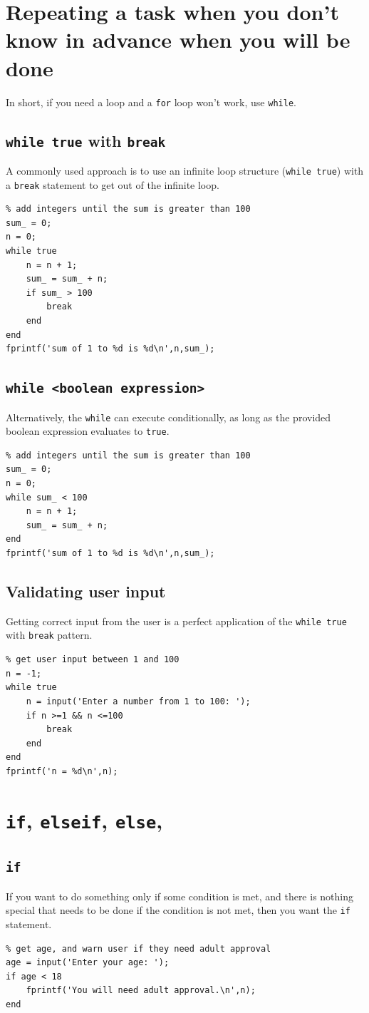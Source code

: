 \documentclass{report}[11pt]
\newcommand{\code}[1]{\texttt{#1}}
\begin{document}
\section{Repeating a task when you don't know in advance when you will be done}
In short, if you need a loop and a  \code{for} loop won't work, use \code{while}.
\subsection{\code{while true} with \code{break}}
A commonly used approach is to use an infinite loop structure (\code{while true}) with a \code{break} statement to get out of the infinite loop.
\begin{lstlisting}
% add integers until the sum is greater than 100
sum_ = 0;
n = 0;
while true
    n = n + 1;
    sum_ = sum_ + n;
    if sum_ > 100
        break
    end
end
fprintf('sum of 1 to %d is %d\n',n,sum_);
\end{lstlisting}

\subsection{\code{while <boolean expression>}}
Alternatively, the \code{while} can execute conditionally, as long as the provided boolean expression evaluates to \code{true}.
\begin{lstlisting}
% add integers until the sum is greater than 100
sum_ = 0;
n = 0;
while sum_ < 100
    n = n + 1;
    sum_ = sum_ + n;
end
fprintf('sum of 1 to %d is %d\n',n,sum_);
\end{lstlisting}

\pagebreak
\subsection{Validating user input}
Getting correct input from the user is a perfect application of the  \code{while true} with \code{break} pattern.
\begin{lstlisting}
% get user input between 1 and 100
n = -1;
while true
    n = input('Enter a number from 1 to 100: ');
    if n >=1 && n <=100
        break
    end
end
fprintf('n = %d\n',n);
\end{lstlisting}

\section{\code{if}, \code{elseif}, \code{else}, }

\subsection{\code{if}}
If you want to do something only if some condition is met, and there is nothing special that needs to be done if the condition is not met, then you want the \code{if} statement. 
\begin{lstlisting}
% get age, and warn user if they need adult approval
age = input('Enter your age: ');
if age < 18
    fprintf('You will need adult approval.\n',n);
end
\end{lstlisting}
\end{document}
